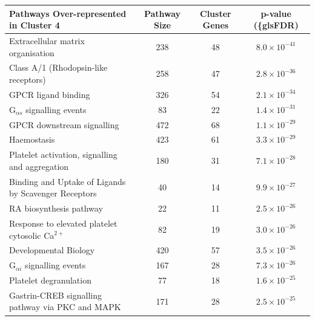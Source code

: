 \begin{table}[!hp]
{\begin{threeparttable}
\begin{tabular}{lccc}
   \hline
  \cellcolor{white} \large{\textbf{Pathways Over-represented in Cluster 4}} & \large{\textbf{Pathway Size}} & \large{\textbf{Cluster Genes}} & \large{\textbf{p-value (\{gls{FDR})}} \\ %
  \hline 
  \rowcolor{Cluster_Red!20}
  Extracellular matrix organisation & 238 &  48 & $8.0 \times 10^{-41}$ \\
  \rowcolor{Cluster_Red!15} 
  Class A/1 (Rhodopsin-like receptors) & 258 &  47 & $2.8 \times 10^{-36}$ \\
  \rowcolor{Cluster_Red!20} 
  GPCR ligand binding & 326 &  54 & $2.1 \times 10^{-34}$ \\
  \rowcolor{Cluster_Red!15} 
  G$_{\alpha s}$ signalling events &  83 &  22 & $1.4 \times 10^{-31}$ \\
  \rowcolor{Cluster_Red!20} 
  GPCR downstream signalling & 472 &  68 & $1.1 \times 10^{-29}$ \\
  \rowcolor{Cluster_Red!15} 
  Haemostasis & 423 &  61 & $3.3 \times 10^{-29}$ \\
  \rowcolor{Cluster_Red!20} 
  Platelet activation, signalling and aggregation & 180 &  31 & $7.1 \times 10^{-28}$ \\
  \rowcolor{Cluster_Red!15} 
  Binding and Uptake of Ligands by Scavenger Receptors &  40 &  14 & $9.9 \times 10^{-27}$ \\
  \rowcolor{Cluster_Red!20} 
  RA biosynthesis pathway &  22 &  11 & $2.5 \times 10^{-26}$ \\
  \rowcolor{Cluster_Red!15} 
  Response to elevated platelet cytosolic Ca$^{2+}$ &  82 &  19 & $3.0 \times 10^{-26}$ \\
  \rowcolor{Cluster_Red!20} 
  Developmental Biology & 420 &  57 & $3.5 \times 10^{-26}$ \\
  \rowcolor{Cluster_Red!15} 
  G$_{\alpha i}$ signalling events & 167 &  28 & $7.3 \times 10^{-26}$ \\
  \rowcolor{Cluster_Red!20} 
  Platelet degranulation &  77 &  18 & $1.6 \times 10^{-25}$ \\
  \rowcolor{Cluster_Red!15} 
  Gastrin-CREB signalling pathway via PKC and MAPK & 171 &  28 & $2.5 \times 10^{-25}$ \\

\end{tabular}
\end{threeparttable}}
\end{table}
